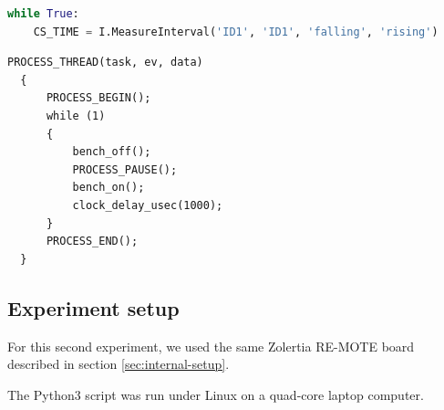 \begin{lstlisting}[style=CStyle, language=python, label={lst:pslab-script-code}, caption={Call to the PSLab Python library}]
  while True:
    CS_TIME = I.MeasureInterval('ID1', 'ID1', 'falling', 'rising')
\end{lstlisting}

\begin{lstlisting}[style=CStyle, label={lst:internal-task-code}, caption={Source code of a task using the external benchmarking framework}]
  PROCESS_THREAD(task, ev, data)
  {
      PROCESS_BEGIN();
      while (1)
      {
          bench_off();
          PROCESS_PAUSE();
          bench_on();
          clock_delay_usec(1000);
      }
      PROCESS_END();
  }
\end{lstlisting}

\subsection{Experiment setup}
For this second experiment, we used the same Zolertia RE-MOTE board described in section \ref{sec:internal-setup}.

The Python3 script was run under Linux on a quad-core laptop computer.